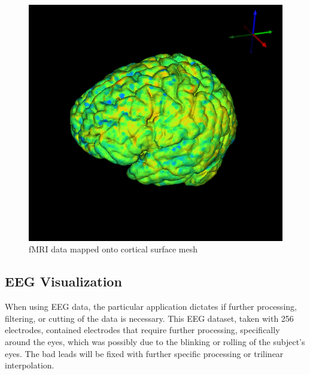 \begin{figure}[H]
\begin{center}
\includegraphics[width=.75\textwidth]{Figures/fmri_1}
\caption{fMRI data mapped onto cortical surface mesh}
\label{fig:fmrivis}
\end{center}
\end{figure}

\subsection{EEG Visualization}

When using EEG data, the particular application dictates if further processing, filtering, or cutting of the data is necessary. This EEG dataset, taken with 256 electrodes, contained electrodes that require further processing, specifically around the eyes, which was possibly due to the blinking or rolling of the subject's eyes. The bad leads will be fixed with further specific processing or trilinear interpolation.

